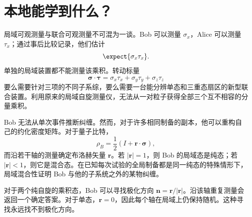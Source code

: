 \begin{classroomqa}
\end{classroomqa}

\section{本地能学到什么？}

局域可观测量与联合可观测量不可混为一谈。Bob 可以测量 \(\sigma_x\)，Alice 可以测量 \(\tau_x\)；通过事后比较记录，他们估计
\begin{equation}
\expect{\sigma_x\tau_x}.
\end{equation}
单独的局域装置都不能测量该乘积。转动标量
\begin{equation}
\boldsymbol{\sigma}\cdot\boldsymbol{\tau}
=\sigma_x\tau_x+\sigma_y\tau_y+\sigma_z\tau_z
\end{equation}
要么需要针对三项的不同子系综，要么需要一台能分辨单态和三重态扇区的新型联合装置。利用原来的局域自旋测量仪，无法从一对粒子获得全部三个互不相容的分量乘积。

\begin{classroomqa}
\end{classroomqa}

Bob 无法从单次事件推断纠缠。然而，对于许多相同制备的副本，他可以重构自己的约化密度矩阵。对于量子比特，
\begin{equation}
\rho_B
=\frac12\left(
I+\mathbf r\cdot\boldsymbol{\sigma}
\right),
\label{eq:l7-bloch-density}
\end{equation}
而沿若干轴的测量确定布洛赫矢量 \(\mathbf r\)。若 \(|\mathbf r|=1\)，则 Bob 的局域态是纯态；若 \(|\mathbf r|<1\)，则它是混合态。在已知每次试验的全局制备都是同一纯态的特殊情形下，局域混合性证明 Bob 与他的子系统之外的某物纠缠。

对于两个纯自旋的乘积态，Bob 可以寻找极化方向 \(\mathbf n=\mathbf r/|\mathbf r|\)。沿该轴重复测量会返回一个确定答案。对于单态，\(\mathbf r=0\)，因此每个轴在局域上仍保持随机。这种寻找永远找不到极化方向。

